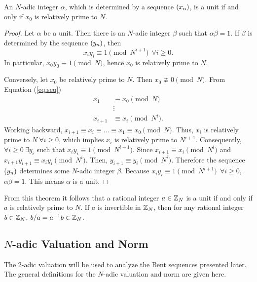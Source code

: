 \begin{theorem}\label{thm:units}
  An $N$-adic integer $\alpha$, which is determined by a sequence $(x_n)$, is
  a unit if and only if $x_0$ is relatively prime to $N$.
\end{theorem}
\begin{proof}
  Let $\alpha$ be a unit. Then there is an $N$-adic integer $\beta$ such
  that $\alpha\beta=1$. If $\beta$ is determined by the sequence $(y_n)$, then
  \begin{equation}\label{eq:units}
    x_iy_i\equiv1\pmod{N^{i+1}} \ \ \forall i \geq 0.
  \end{equation}
  In particular, $x_0y_0\equiv1\pmod N$, hence $x_0$ is relatively prime to
  $N$. 
  \par Conversely, let $x_0$ be relatively prime to $N$. Then
  $x_0\not\equiv0\pmod{N}$. From Equation (\ref{eq:seq})
  \begin{align*}
    x_1 &\equiv x_0 \pmod N\\
    &\vdots \\
    x_{i+1} &\equiv x_i \pmod{N^i}. 
  \end{align*}
  Working backward, $x_{i+1} \equiv x_i \equiv \dots \equiv x_1 \equiv
  x_0 \pmod N$. Thus, $x_i$ is relatively prime to $N \ \forall i\geq0$,
  which implies $x_i$ is relatively prime to $N^{i+1}$. Consequently,
  $\forall i\geq0 \ \exists y_i$ such that $x_iy_i \equiv 1 \pmod{N^{i+1}}$.
  Since $x_{i+1} \equiv x_i \pmod N^i$ and $x_{i+1}y_{i+1} \equiv
  x_iy_i \pmod{N^i}$. Then, $y_{i+1} \equiv y_i \pmod{N^i}$. Therefore the
  sequence $(y_n)$ determines some $N$-adic integer $\beta$. Because
  $x_iy_i \equiv 1 \pmod{N^{i+1}} \ \ \forall i \geq 0$, $\alpha\beta=1$.
  This means $\alpha$ is a unit.
\end{proof}

\par From this theorem it follows that a rational integer $a\in\mathbb{Z}_N$ is a
unit if and only if $a$ is relatively prime to $N$. If $a$ is invertible in
$\mathbb{Z}_N$, then for any rational integer $b\in\mathbb{Z}_N$, $b/a=a^{-1}b\in\mathbb{Z}_N$.


\subsection{$N$-adic Valuation and Norm}
\par The 2-adic valuation will be used to analyze the Bent sequences
presented later. The general definitions for the $N$-adic valuation and
norm are given here.

